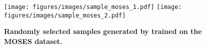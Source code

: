 \begin{figure}[h!]
    \centering
    \texttt{[image: figures/images/sample\_moses\_1.pdf]}
    \texttt{[image: figures/images/sample\_moses\_2.pdf]}
    \caption{\textbf{Randomly selected samples generated by \methodname{} trained on the MOSES dataset.}}
    \label{fig:sample_moses}
\end{figure}